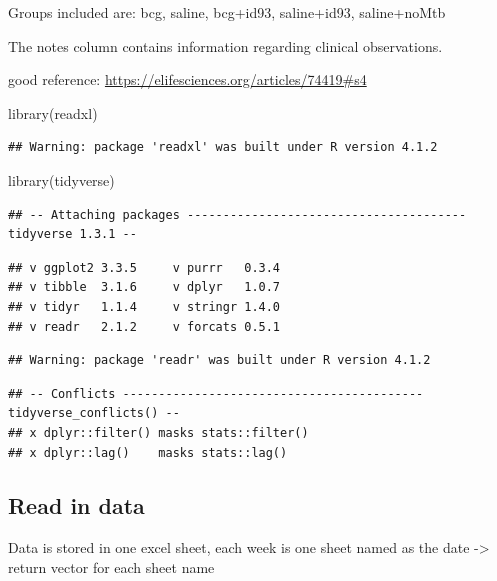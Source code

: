 \documentclass[
]{book}
\newenvironment{Shaded}{\begin{snugshade}}{\end{snugshade}}
\newcommand{\FunctionTok}[1]{\textcolor[rgb]{0.00,0.00,0.00}{#1}}
\newcommand{\NormalTok}[1]{#1}
\begin{document}
Groups included are: bcg, saline, bcg+id93, saline+id93, saline+noMtb

The notes column contains information regarding clinical observations.

good reference: \url{https://elifesciences.org/articles/74419\#s4}

\begin{Shaded}
\begin{Highlighting}[]
\FunctionTok{library}\NormalTok{(readxl)}
\end{Highlighting}
\end{Shaded}

\begin{verbatim}
## Warning: package 'readxl' was built under R version 4.1.2
\end{verbatim}

\begin{Shaded}
\begin{Highlighting}[]
\FunctionTok{library}\NormalTok{(tidyverse)}
\end{Highlighting}
\end{Shaded}

\begin{verbatim}
## -- Attaching packages --------------------------------------- tidyverse 1.3.1 --
\end{verbatim}

\begin{verbatim}
## v ggplot2 3.3.5     v purrr   0.3.4
## v tibble  3.1.6     v dplyr   1.0.7
## v tidyr   1.1.4     v stringr 1.4.0
## v readr   2.1.2     v forcats 0.5.1
\end{verbatim}

\begin{verbatim}
## Warning: package 'readr' was built under R version 4.1.2
\end{verbatim}

\begin{verbatim}
## -- Conflicts ------------------------------------------ tidyverse_conflicts() --
## x dplyr::filter() masks stats::filter()
## x dplyr::lag()    masks stats::lag()
\end{verbatim}

\hypertarget{read-in-data}{%
\subsection{Read in data}\label{read-in-data}}

Data is stored in one excel sheet, each week is one sheet named as the date -\textgreater{} return vector for each sheet name
\end{document}

